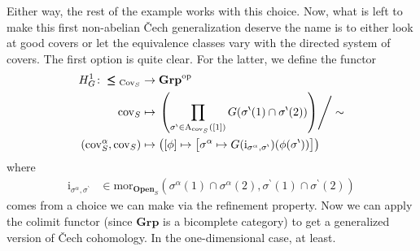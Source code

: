 \begin{exa}
Either way, the rest of the example works with this choice.
Now, what is left to make this first non-abelian \v{C}ech generalization deserve the name is to either look at good covers or let the equivalence classes vary with the directed system of covers.
The first option is quite clear.
For the latter, we define the functor
\begin{align*}
  H_{G}^{1}
  \colon
  \pmb{\leq}_{\mathrm{Cov}_{S}}
  &\rightarrow
  \mathbf{Grp}^{\mathrm{op}}
  \\
  \mathrm{cov}_{S}
  &\mapsto
  \left.
    \left(
      \prod_{\sigma^{\backprime} \in \mathrm{A}_{\mathrm{cov}_{S}}([1])}
      G(\sigma^{\backprime}(1) \cap \sigma^{\backprime}(2))
    \right)
  \right\slash
  \sim
  \\
  \left(
    \mathrm{cov}_{S}^{\alpha},
    \mathrm{cov}_{S}
  \right)
  &\mapsto
  \left(
    [\phi]
    \mapsto
    \left[
      \sigma^{\alpha}
      \mapsto
      G(\mathrm{i}_{\sigma^{\alpha},\sigma^{\backprime}})
      (\phi(\sigma^{\backprime}))
    \right]
  \right)
\end{align*}
where
\begin{align*}
  \mathrm{i}_{\sigma^{\alpha},\sigma^{\backprime}}
  &\in
  \mathrm{mor}_{\mathbf{Open}_{S}}
  \left(
    \sigma^{\alpha}(1)
    \cap
    \sigma^{\alpha}(2),
    \sigma^{\backprime}(1)
    \cap
    \sigma^{\backprime}(2)
  \right)
\end{align*}
comes from a choice we can make via the refinement property.
Now we can apply the colimit functor (since $\mathbf{Grp}$ is a bicomplete category) to get a generalized version of \v{C}ech cohomology.
In the one-dimensional case, at least.


\end{exa}
